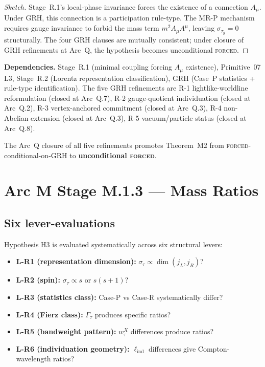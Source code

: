 \documentclass[11pt,a4paper]{article}
\begin{document}
\begin{proof}[Sketch]
Stage~R.1's local-phase invariance forces the existence of a connection $A_\mu$. Under GRH, this connection is a participation rule-type. The MR-P mechanism requires gauge invariance to forbid the mass term $m^2 A_\mu A^\mu$, leaving $\sigma_{\tau_g} = 0$ structurally. The four GRH clauses are mutually consistent; under closure of GRH refinements at Arc~Q, the hypothesis becomes unconditional \textsc{forced}.
\end{proof}

\textbf{Dependencies.} Stage~R.1 (minimal coupling forcing $A_\mu$ existence), Primitive~07 L3, Stage~R.2 (Lorentz representation classification), GRH (Case~P statistics + rule-type identification). The five GRH refinements are R-1 lightlike-worldline reformulation (closed at Arc~Q.7), R-2 gauge-quotient individuation (closed at Arc~Q.2), R-3 vertex-anchored commitment (closed at Arc~Q.3), R-4 non-Abelian extension (closed at Arc~Q.3), R-5 vacuum/particle status (closed at Arc~Q.8).

The Arc~Q closure of all five refinements promotes Theorem~M2 from \textsc{forced}-conditional-on-GRH to \textbf{unconditional \textsc{forced}}.

\section{Arc M Stage M.1.3 --- Mass Ratios}

\subsection{Six lever-evaluations}

Hypothesis H3 is evaluated systematically across six structural levers:
\begin{itemize}
  \item \textbf{L-R1 (representation dimension):} $\sigma_\tau \propto \dim(j_L, j_R)$?
  \item \textbf{L-R2 (spin):} $\sigma_\tau \propto s$ or $s(s+1)$?
  \item \textbf{L-R3 (statistics class):} Case-P vs Case-R systematically differ?
  \item \textbf{L-R4 (Fierz class):} $\Gamma_\tau$ produces specific ratios?
  \item \textbf{L-R5 (bandweight pattern):} $w_\tau^X$ differences produce ratios?
  \item \textbf{L-R6 (individuation geometry):} $\ell_{\mathrm{ind}}$ differences give Compton-wavelength ratios?
\end{itemize}
\end{document}
